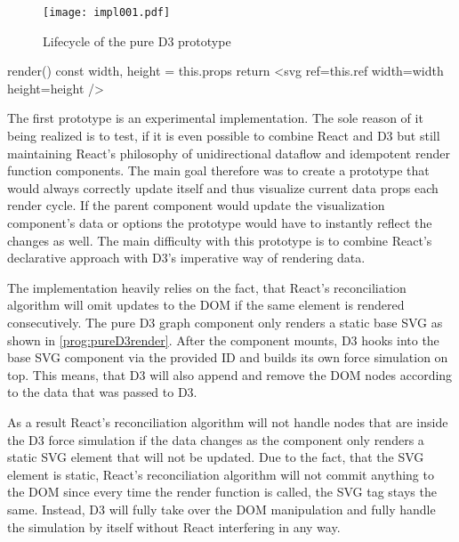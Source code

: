 \begin{figure}
\centering
\texttt{[image: impl001.pdf]}
\caption{Lifecycle of the pure D3 prototype}
\label{fig:pureD3Lifecycle}
\end{figure}

\begin{program}
\caption{Render function of the pure D3 prototype}
\label{prog:pureD3render}
\begin{JsCode}
render() {
  const { width, height } = this.props
  return <svg ref={this.ref} width={width} height={height} />
}
\end{JsCode}
\end{program}

The first prototype is an experimental implementation. The sole reason of it being realized is to test, if it is even possible to combine React and D3 but still maintaining React's philosophy of unidirectional dataflow and idempotent render function components. The main goal therefore was to create a prototype that would always correctly update itself and thus visualize current data props each render cycle. If the parent component would update the visualization component's data or options the prototype would have to instantly reflect the changes as well. The main difficulty with this prototype is to combine React's declarative approach with D3's imperative way of rendering data.

The implementation heavily relies on the fact, that React's reconciliation algorithm will omit updates to the DOM if the same element is rendered consecutively. The pure D3 graph component only renders a static base SVG as shown in \ref{prog:pureD3render}. After the component mounts, D3 hooks into the base SVG component via the provided ID and builds its own force simulation on top. This means, that D3 will also append and remove the DOM nodes according to the data that was passed to D3. 

As a result React's reconciliation algorithm will not handle nodes that are inside the D3 force simulation if the data changes as the component only renders a static SVG element that will not be updated. Due to the fact, that the SVG element is static, React's reconciliation algorithm will not commit anything to the DOM since every time the render function is called, the SVG tag stays the same. Instead, D3 will fully take over the DOM manipulation and fully handle the simulation by itself without React interfering in any way.

